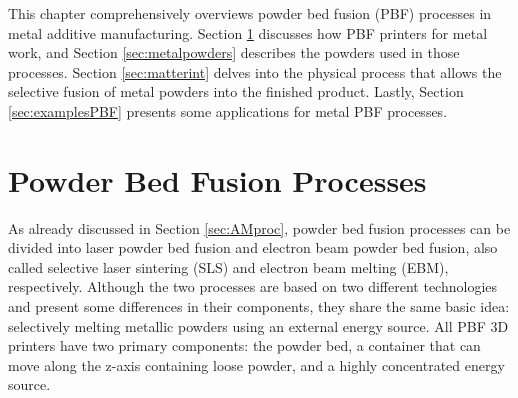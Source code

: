 \setlength{\tabcolsep}{10pt}
This chapter comprehensively overviews powder bed fusion (PBF) processes in metal additive manufacturing. Section \ref{sec:pbf_proc} discusses how PBF printers for metal work, and Section \ref{sec:metalpowders} describes the powders used in those processes. Section \ref{sec:matterint} delves into the physical process that allows the selective fusion of metal powders into the finished product. Lastly, Section \ref{sec:examplesPBF} presents some applications for metal PBF processes.

\section{Powder Bed Fusion Processes}\label{sec:pbf_proc}
As already discussed in Section \ref{sec:AMproc}, powder bed fusion processes can be divided into laser powder bed fusion and electron beam powder bed fusion, also called selective laser sintering (SLS) and electron beam melting (EBM), respectively. Although the two processes are based on two different technologies and present some differences in their components, they share the same basic idea: selectively melting metallic powders using an external energy source. All PBF 3D printers have two primary components: the powder bed, a container that can move along the z-axis containing loose powder, and a highly concentrated energy source. 

